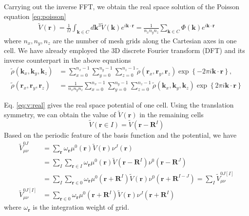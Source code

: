 \documentclass{article}
\begin{document}
Carrying out the inverse FFT, we obtain the real space solution of the Poisson
equation \eqref{eq:poisson}
\begin{align}
  \tilde{V}(\mathbf{r})
  =\frac{1}{\Omega}\int_{\mathbf{k}\in C} d\mathbf{k}^3
  \tilde{V}(\mathbf{k}) e^{i\mathbf{k}\cdot\mathbf{r}}
  =\frac{1}{n_xn_yn_z}\sum_{\mathbf{k}\in C}
  \Phi(\mathbf{k}) e^{i\mathbf{k}\cdot \mathbf{r}}
  \label{eq:v:real}
\end{align}
where $n_x,n_y,n_z$ are the number of mesh grids along the Cartesian axes in
one cell.  We have already employed the 3D discrete Fourier transform (DFT)
and its inverse counterpart in the above equations
\begin{align}
  \tilde{\rho}(\mathbf{k}_x,\mathbf{k}_y,\mathbf{k}_z)
  &=\sum_{x=0}^{n_x-1} \sum_{y=0}^{n_y-1} \sum_{z=0}^{n_z-1}
  \tilde{\rho}(\mathbf{r}_x,\mathbf{r}_y,\mathbf{r}_z)
  \exp\left\{-2\pi i \mathbf{k}\cdot\mathbf{r}\right\},
  \\
  \tilde{\rho}(\mathbf{r}_x,\mathbf{r}_y,\mathbf{r}_z)
  &=\frac{1}{n_xn_yn_z}\sum_{x=0}^{n_x-1}
  \sum_{y=0}^{n_y-1} \sum_{z=0}^{n_z-1}
  \tilde{\rho}(\mathbf{k}_x,\mathbf{k}_y,\mathbf{k}_z)
  \exp\left\{2\pi i \mathbf{k}\cdot \mathbf{r}\right\}
  \label{}
\end{align}

Eq. \eqref{eq:v:real} gives the real space potential of one cell.
Using the translation symmetry, we can obtain the value of
$\tilde{V}(\mathbf{r})$ in the remaining cells
\begin{equation}
  \tilde{V}(\mathbf{r}\in I) = \tilde{V}(\mathbf{r}-\mathbf{R}^I)
  \label{}
\end{equation}
Based on the periodic feature of the basis function and the potential, we
have
\begin{align}
  \tilde{V}_{\mu\nu}^{0J}
  &=\sum_{\mathbf{r}} \omega_\mathbf{r}
  \mu^0(\mathbf{r})\tilde{V}(\mathbf{r})\nu^J(\mathbf{r})
  \\
  &=\sum_{I}\sum_{\mathbf{r}\in I} \omega_\mathbf{r} \mu^0(\mathbf{r})
  \tilde{V}(\mathbf{r} - \mathbf{R}^I)\nu^0(\mathbf{r}-\mathbf{R}^J)
  \\
  &=\sum_{I}\sum_{\mathbf{r}\in 0} \omega_\mathbf{r}
  \mu^0(\mathbf{r}+\mathbf{R}^I)
  \tilde{V}(\mathbf{r})\nu^0(\mathbf{r} + \mathbf{R}^{I-J})
  =\sum_I \tilde{V}_{\mu\nu}^{0J[I]}
  \label{eq:v:r0} \\
  \tilde{V}_{\mu\nu}^{0J[I]}
  &=\sum_{\mathbf{r}\in 0} \omega_\mathbf{r} \mu^0(\mathbf{r}+\mathbf{R}^I)
  \tilde{V}(\mathbf{r})\nu^J(\mathbf{r} + \mathbf{R}^{I})
\end{align}
where $\omega_\mathbf{r}$ is the integration weight of grid.
\end{document}
